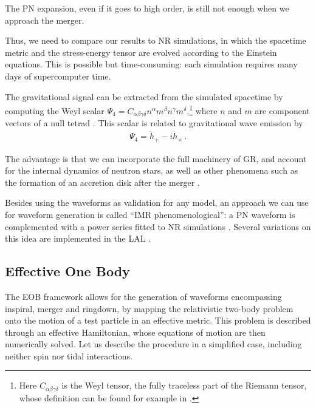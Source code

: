 \documentclass[main.tex]{subfiles}
\begin{document}
The \ac{PN} expansion, even if it goes to high order, is still not enough when we approach the merger. 

Thus, we need to compare our results to \ac{NR} simulations, in which the spacetime metric and the stress-energy tensor are evolved according to the Einstein equations. 
This is possible but time-consuming: each simulation requires many days of supercomputer time. 

The gravitational signal can be extracted from the simulated spacetime by computing the Weyl scalar \(\Psi_{4} = C_{\alpha \beta \gamma \delta }n^\alpha m^\beta n^\gamma m^\delta \),\footnote{Here \(C_{\alpha \beta \gamma \delta }\) is the Weyl tensor, the fully traceless part of the Riemann tensor, whose definition can be found for example in \textcite[eq.\ 2.18]{gourgoulhonFormalismBasesNumerical2007}.} where \(n\) and \(m\) are component vectors of a null tetrad \cite[sec.\ 5.6.3]{lofflerEinsteinToolkitCommunity2012}. This scalar is related to gravitational wave emission by 
%
\begin{align}
\Psi_{4} = \ddot{h}_+ - i \ddot{h}_{\times }
\,.
\end{align}


The advantage is that we can incorporate the full machinery of \ac{GR}, and account for the internal dynamics of neutron stars, as well as other phenomena such as the formation of an accretion disk after the merger \cite{nedoraNumericalRelativitySimulations2020}.

Besides using the waveforms as validation for any model, 
an approach we can use for waveform generation is called ``\ac{IMR} phenomenological'': a \ac{PN} waveform is complemented with a power series fitted to \ac{NR} simulations \cite{kumarAccuracyPrecisionGravitationalwave2015}. 
Several variations on this idea are implemented in the \ac{LAL} \cite[]{ligoscientificcollaborationLIGOAlgorithmLibrary2018}.

\subsection{Effective One Body} \label{sec:eob}

The \ac{EOB} framework allows for the generation of waveforms encompassing inspiral, merger and ringdown, by mapping the relativistic two-body problem onto the motion of a test particle in an effective metric. 
This problem is described through an effective Hamiltonian, whose equations of motion are then numerically solved. 
Let us describe the procedure in a simplified case, including neither spin nor tidal interactions. 
\end{document}
